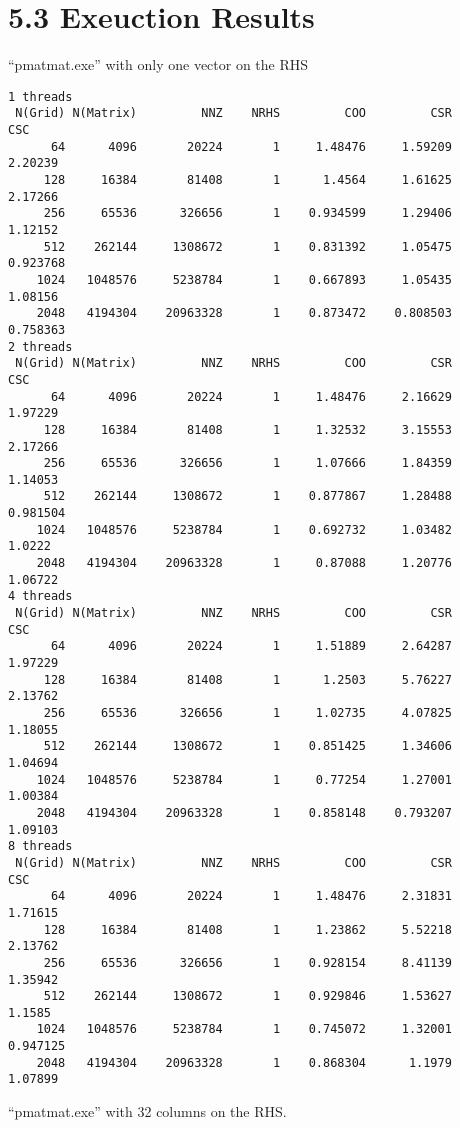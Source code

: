 \documentclass[]{article}
\begin{document}
\section*{5.3 Exeuction Results}\label{5.3.2.appendix}
    ``pmatmat.exe'' with only one vector on the RHS
    \begin{lstlisting}
1 threads   
 N(Grid) N(Matrix)         NNZ    NRHS         COO         CSR         CSC
      64      4096       20224       1     1.48476     1.59209     2.20239
     128     16384       81408       1      1.4564     1.61625     2.17266
     256     65536      326656       1    0.934599     1.29406     1.12152
     512    262144     1308672       1    0.831392     1.05475    0.923768
    1024   1048576     5238784       1    0.667893     1.05435     1.08156
    2048   4194304    20963328       1    0.873472    0.808503    0.758363
2 threads   
 N(Grid) N(Matrix)         NNZ    NRHS         COO         CSR         CSC
      64      4096       20224       1     1.48476     2.16629     1.97229
     128     16384       81408       1     1.32532     3.15553     2.17266
     256     65536      326656       1     1.07666     1.84359     1.14053
     512    262144     1308672       1    0.877867     1.28488    0.981504
    1024   1048576     5238784       1    0.692732     1.03482      1.0222
    2048   4194304    20963328       1     0.87088     1.20776     1.06722
4 threads   
 N(Grid) N(Matrix)         NNZ    NRHS         COO         CSR         CSC
      64      4096       20224       1     1.51889     2.64287     1.97229
     128     16384       81408       1      1.2503     5.76227     2.13762
     256     65536      326656       1     1.02735     4.07825     1.18055
     512    262144     1308672       1    0.851425     1.34606     1.04694
    1024   1048576     5238784       1     0.77254     1.27001     1.00384
    2048   4194304    20963328       1    0.858148    0.793207     1.09103
8 threads   
 N(Grid) N(Matrix)         NNZ    NRHS         COO         CSR         CSC
      64      4096       20224       1     1.48476     2.31831     1.71615
     128     16384       81408       1     1.23862     5.52218     2.13762
     256     65536      326656       1    0.928154     8.41139     1.35942
     512    262144     1308672       1    0.929846     1.53627      1.1585
    1024   1048576     5238784       1    0.745072     1.32001    0.947125
    2048   4194304    20963328       1    0.868304      1.1979     1.07899
    \end{lstlisting}
    ``pmatmat.exe'' with 32 columns on the RHS. 
\end{document}
